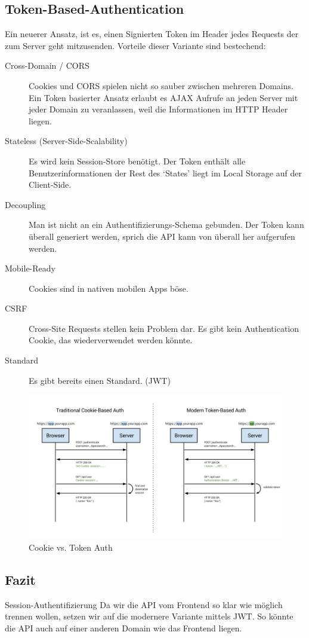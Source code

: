 \subsection{Token-Based-Authentication}
Ein neuerer Ansatz, ist es, einen Signierten Token im Header jedes Requests der zum Server geht mitzusenden. Vorteile dieser Variante sind bestechend:
\begin{description}
  \item[Cross-Domain / CORS]
  Cookies und CORS spielen nicht so sauber zwischen mehreren Domains. Ein Token basierter Ansatz erlaubt es AJAX Aufrufe an jeden Server mit jeder Domain zu veranlassen, weil die Informationen im HTTP Header liegen.
  \item[Stateless (Server-Side-Scalability)]Es wird kein Session-Store benötigt. Der Token enthält alle Benutzerinformationen der Rest des `States' liegt im Local Storage auf der Client-Side.
  \item[Decoupling] Man ist nicht an ein Authentifizierungs-Schema gebunden. Der Token kann überall generiert werden, sprich die API kann von überall her aufgerufen werden.
  \item[Mobile-Ready]Cookies sind in nativen mobilen Apps böse.
  \item[CSRF]Cross-Site Requests stellen kein Problem dar. Es gibt kein Authentication Cookie, das wiederverwendet werden könnte.
  \item[Standard]Es gibt bereits einen Standard. (\gls{JWT})
\end{description}
\begin{figure}[H]
    \centering
    \includegraphics[width=\linewidth]{fig/cookie-token-auth}
    \caption{Cookie vs. Token Auth}
    \label{fig:pd:cookie-token-auth}
\end{figure}
\subsection{Fazit}
\begin{decision}{Session-Authentifizierung}
Da wir die API vom Frontend so klar wie möglich trennen wollen, setzen wir auf die modernere Variante mittels \acs{JWT}. So könnte die API auch auf einer anderen Domain wie das Frontend liegen.
\end{decision}
